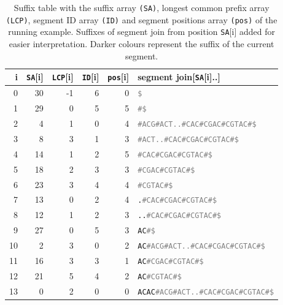 \begin{table*}
    \caption{
        Suffix table with the suffix array \texttt{(SA)}, longest common prefix array \texttt{(LCP)}, segment ID array \texttt{(ID)} and segment positions array \texttt{(pos)} of the running example. Suffixes of segment join from position \texttt{SA}[i] added for easier interpretation. Darker colours represent the suffix of the current segment. \label{tab:suffix}
    }
    \begin{tabular}{rrrrrl}
        \toprule
        i & \texttt{SA}[i] & \texttt{LCP}[i] & \texttt{ID}[i] & \texttt{pos}[i] & segment join[\texttt{SA}[i]..] \\
        \midrule
         0  & 30 & -1 & 6 & 0 & \texttt{\textcolor{gray}{\$}}                                     \\
         1  & 29 &  0 & 5 & 5 & \texttt{\textcolor{gray}{\#\$}}                                   \\
         2  &  4 &  1 & 0 & 4 & \texttt{\textcolor{gray}{\#ACG\#ACT..\#CAC\#CGAC\#CGTAC\#\$}}     \\
         3  &  8 &  3 & 1 & 3 & \texttt{\textcolor{gray}{\#ACT..\#CAC\#CGAC\#CGTAC\#\$}}          \\
         4  & 14 &  1 & 2 & 5 & \texttt{\textcolor{gray}{\#CAC\#CGAC\#CGTAC\#\$}}                 \\
         5  & 18 &  2 & 3 & 3 & \texttt{\textcolor{gray}{\#CGAC\#CGTAC\#\$}}                      \\
         6  & 23 &  3 & 4 & 4 & \texttt{\textcolor{gray}{\#CGTAC\#\$}}                            \\
         7  & 13 &  0 & 2 & 4 & \texttt{.\textcolor{gray}{\#CAC\#CGAC\#CGTAC\#\$}}                \\
         8  & 12 &  1 & 2 & 3 & \texttt{..\textcolor{gray}{\#CAC\#CGAC\#CGTAC\#\$}}               \\
         9  & 27 &  0 & 5 & 3 & \texttt{AC\textcolor{gray}{\#\$}}                                 \\
        10  &  2 &  3 & 0 & 2 & \texttt{AC\textcolor{gray}{\#ACG\#ACT..\#CAC\#CGAC\#CGTAC\#\$}}   \\
        11  & 16 &  3 & 3 & 1 & \texttt{AC\textcolor{gray}{\#CGAC\#CGTAC\#\$}}                    \\
        12  & 21 &  5 & 4 & 2 & \texttt{AC\textcolor{gray}{\#CGTAC\#\$}}                          \\
        13  &  0 &  2 & 0 & 0 & \texttt{ACAC\textcolor{gray}{\#ACG\#ACT..\#CAC\#CGAC\#CGTAC\#\$}} \\

\end{tabular}
\end{table*}
